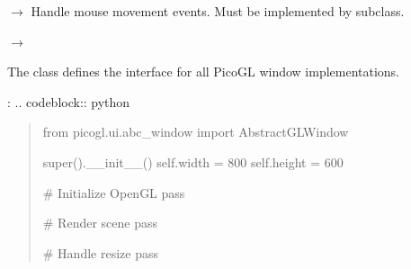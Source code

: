 \documentclass[a4paper,10pt,english,openany,oneside]{sphinxmanual}
\begin{document}
\begin{fulllineitems}
\begin{fulllineitems}
\end{fulllineitems}


\begin{fulllineitems}
\label{\detokenize{api/ui:picogl.ui.abc_window.AbstractGLWindow.mouseMoveEvent}}
\pysigstartsignatures
\pysiglinewithargsret
{}
{\sphinxparamcomma {}}
{{ $\rightarrow$ }}
\pysigstopsignatures
\sphinxAtStartPar
Handle mouse movement events. Must be implemented by subclass.

\end{fulllineitems}


\begin{fulllineitems}
\label{\detokenize{api/ui:picogl.ui.abc_window.AbstractGLWindow.run}}
\pysigstartsignatures
\pysiglinewithargsret
{}
{}
{{ $\rightarrow$ }}
\pysigstopsignatures
\end{fulllineitems}


\end{fulllineitems}


\sphinxAtStartPar
The  class defines the interface for all PicoGL window implementations.

\sphinxAtStartPar
{}:
.. code\sphinxhyphen{}block:: python
\begin{quote}

\sphinxAtStartPar
from picogl.ui.abc\_window import AbstractGLWindow
\begin{description}
\begin{description}
\sphinxAtStartPar
super().\_\_init\_\_()
self.width = 800
self.height = 600

\sphinxAtStartPar
\# Initialize OpenGL
pass

\sphinxAtStartPar
\# Render scene
pass

\sphinxAtStartPar
\# Handle resize
pass

\end{description}

\end{description}
\end{quote}
\end{document}
